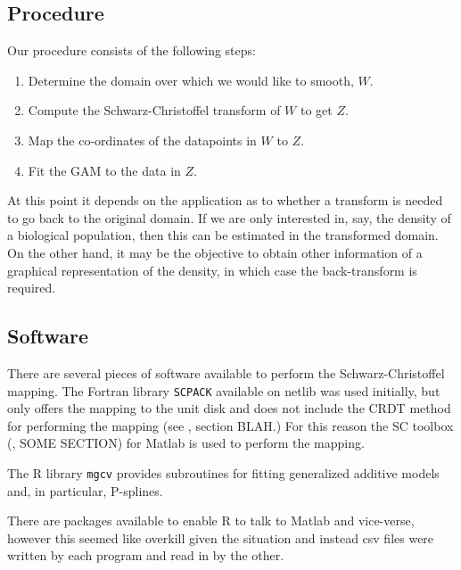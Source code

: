 \documentclass[a4paper,10pt]{amsart}
\newcommand{\sch}{Schwarz-Christoffel }
\begin{document}
\subsection{Procedure}

Our procedure consists of the following steps:

\begin{enumerate}
\item Determine the domain over which we would like to smooth, $W$.

\item Compute the \sch transform of $W$ to get $Z$.

\item Map the co-ordinates of the datapoints in $W$ to $Z$.

\item Fit the GAM to the data in $Z$.

\end{enumerate}

At this point it depends on the application as to whether a transform is needed to go back to the original domain. If we are only interested in, say, the density of a biological population, then this can be estimated in the transformed domain. On the other hand, it may be the objective to obtain other information of a graphical representation of the density, in which case the back-transform is required.



\subsection{Software}

There are several pieces of software available to perform the \sch mapping. The Fortran library \texttt{SCPACK} available on netlib was used initially, but only offers the mapping to the unit disk and does not include the CRDT method for performing the mapping (see \cite{miller08}, section BLAH.) For this reason the SC toolbox (\cite{driscoll}, SOME SECTION) for Matlab is used to perform the mapping. 

The \textsf{R} library \texttt{mgcv} provides subroutines for fitting generalized additive models and, in particular, P-splines.

There are packages available to enable \textsf{R} to talk to Matlab and vice-verse, however this seemed like overkill given the situation and instead csv files were written by each program and read in by the other.
\end{document}
